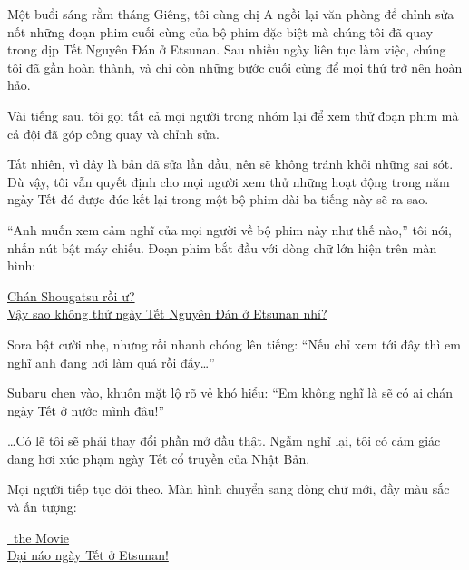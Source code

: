 \documentclass[../main.tex]{subfiles}
\begin{document}

Một buổi sáng rằm tháng Giêng, tôi cùng chị A ngồi lại văn phòng để chỉnh sửa nốt những đoạn phim cuối cùng của bộ phim đặc biệt mà chúng tôi đã quay trong dịp Tết Nguyên Đán ở Etsunan. Sau nhiều ngày liên tục làm việc, chúng tôi đã gần hoàn thành, và chỉ còn những bước cuối cùng để mọi thứ trở nên hoàn hảo.

Vài tiếng sau, tôi gọi tất cả mọi người trong nhóm lại để xem thử đoạn phim mà cả đội đã góp công quay và chỉnh sửa.

Tất nhiên, vì đây là bản đã sửa lần đầu, nên sẽ không tránh khỏi những sai sót. Dù vậy, tôi vẫn quyết định cho mọi người xem thử những hoạt động trong năm ngày Tết đó được đúc kết lại trong một bộ phim dài ba tiếng này sẽ ra sao.

``Anh muốn xem cảm nghĩ của mọi người về bộ phim này như thế nào,'' tôi nói, nhấn nút bật máy chiếu. Đoạn phim bắt đầu với dòng chữ lớn hiện trên màn hình:

\begin{center}
    \uline{Chán Shougatsu rồi ư?\\Vậy sao không thử ngày Tết Nguyên Đán ở Etsunan nhỉ?}
\end{center}

Sora bật cười nhẹ, nhưng rồi nhanh chóng lên tiếng: ``Nếu chỉ xem tới đây thì em nghĩ anh đang hơi làm quá rồi đấy\dots''

Subaru chen vào, khuôn mặt lộ rõ vẻ khó hiểu: ``Em không nghĩ là sẽ có ai chán ngày Tết ở nước mình đâu!''

\dots Có lẽ tôi sẽ phải thay đổi phần mở đầu thật. Ngẫm nghĩ lại, tôi có cảm giác đang hơi xúc phạm ngày Tết cổ truyền của Nhật Bản.

Mọi người tiếp tục dõi theo. Màn hình chuyển sang dòng chữ mới, đầy màu sắc và ấn tượng:

\begin{center}
    \uline{\hll\ the Movie\\Đại náo ngày Tết ở Etsunan!}
\end{center}
\end{document}
